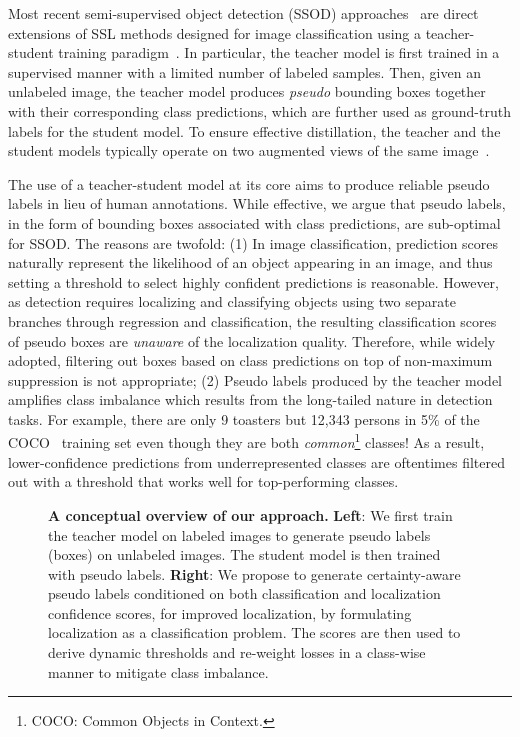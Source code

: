 \documentclass[letterpaper]{article} \usepackage{aaai22}  \usepackage{times}  \usepackage{helvet}  \usepackage{courier}  \usepackage[hyphens]{url}  \usepackage{graphicx} \urlstyle{rm} \def\UrlFont{\rm}  \usepackage{natbib}  \usepackage{caption} \DeclareCaptionStyle{ruled}{labelfont=normalfont,labelsep=colon,strut=off} \frenchspacing  \setlength{\pdfpagewidth}{8.5in}  \setlength{\pdfpageheight}{11in}  \usepackage{algorithm}
\begin{document}
Most recent semi-supervised object detection (SSOD) approaches~\cite{stac,unbiasedteacher,csd,instantteaching} are direct extensions of SSL methods designed for image classification using a teacher-student training paradigm~\cite{meanteacher,sohn2020fixmatch,berthelot2019mixmatch}. In particular, the teacher model is first trained in a supervised manner with a limited number of labeled samples. Then, given an unlabeled image, the teacher model produces \emph{pseudo} bounding boxes together with their corresponding class predictions, which are further used as ground-truth labels for the student model. To ensure effective distillation, the teacher and the student models typically operate on two augmented views of the same image~\cite{sohn2020fixmatch,stac,unbiasedteacher,instantteaching}. 

The use of a teacher-student model at its core aims to produce reliable pseudo labels in lieu of human annotations. While effective, we argue that pseudo labels, in the form of bounding boxes associated with class predictions, are sub-optimal for SSOD. The reasons are twofold: (1) In image classification,  prediction scores naturally represent the likelihood of an object appearing in an image, and thus setting a threshold to select highly confident predictions is reasonable. However, as detection requires localizing and classifying objects using two separate branches through regression and classification, the resulting classification scores of pseudo boxes are \emph{unaware} of the localization quality. Therefore, while widely adopted, filtering out boxes based on class predictions on top of non-maximum suppression is not appropriate; (2) Pseudo labels produced by the teacher model amplifies class imbalance which results from the long-tailed nature in detection tasks.  For example, there are only 9 toasters but 12,343 persons in 5\% of the COCO~\cite{coco} training set even though they are both \emph{common}\footnote{COCO: Common Objects in Context.} classes! As a result, lower-confidence predictions from underrepresented classes are oftentimes filtered out with a threshold that works well for top-performing classes.

\begin{figure*}[t] \centering
  \caption{\textbf{A conceptual overview of our approach.} \textbf{Left}: We first train the teacher model on labeled images to generate pseudo labels (boxes) on unlabeled images. The student model is then trained with pseudo labels. \textbf{Right}: We propose to generate certainty-aware pseudo labels conditioned on both classification and localization confidence scores, for improved localization, by formulating localization as a classification problem. The scores are then used to derive dynamic thresholds and re-weight losses in a class-wise manner to mitigate class imbalance. }
  \label{fig:approach}
\end{figure*}
\end{document}
